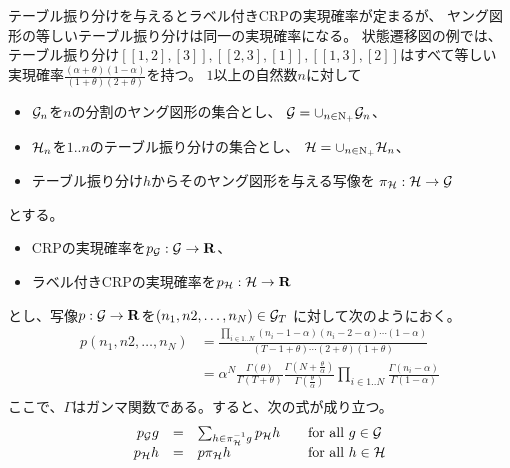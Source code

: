 	テーブル振り分けを与えるとラベル付きCRPの実現確率が定まるが、
	ヤング図形の等しいテーブル振り分けは同一の実現確率になる。
	状態遷移図\label{eq:ラベル付きCRPの遷移図その二}の例では、
	テーブル振り分け$[[1,2],[3]],[[2,3],[1]],[[1,3],[2]]$はすべて等しい
	実現確率$\frac{(\alpha+\theta)(1-\alpha)}{(1+\theta)(2+\theta)}$を持つ。
	$1$以上の自然数$n$に対して
	\begin{itemize}\setlength{\itemsep}{-1mm} %
		\item ${\mathcal{G}}_n$を$n$の分割のヤング図形の集合とし、
		${\mathcal{G}}=\cup_{n\in\operatorname{N}_+}{\mathcal{G}}_n$、
		\item ${\mathcal{H}}_n$を$1..n$のテーブル振り分けの集合とし、
		${\mathcal{H}}=\cup_{n\in\operatorname{N}_+}{\mathcal{H}}_n$、
		\item テーブル振り分け$h$からそのヤング図形を与える写像を
		$\pi_{{\mathcal{H}}}:{\mathcal{H}}\to{\mathcal{G}}$
	\end{itemize} %
	とする。
	\begin{itemize}\setlength{\itemsep}{-1mm} %
		\item CRPの実現確率を$p_{{\mathcal{G}}}:{\mathcal{G}}\to {\mathbf{R}}$、
		\item ラベル付きCRPの実現確率を$p_{{\mathcal{H}}}:{\mathcal{H}}\to {\mathbf{R}}$
	\end{itemize} %
	とし、写像$p:{\mathcal{G}}\to{\mathbf{R}}$を$(n_1,n2,\dots,n_N)\in{\mathcal{G}}_T$
	に対して次のようにおく。
	\begin{equation*}\begin{split} %
		p(n_1,n2,\dots,n_N)
			&= \frac{\prod_{i\in1..N}(n_i-1-\alpha)(n_i-2-\alpha)\cdots(1-\alpha)}
				{(T-1+\theta)\cdots(2+\theta)(1+\theta)} \\
			&= \alpha^N\frac{\Gamma(\theta)}{\Gamma(T+\theta)}
				\frac{\Gamma(N+\frac{\theta}{\alpha})}{\Gamma(\frac{\theta}{\alpha})}
				\prod_{i\in1..N}\frac{\Gamma(n_i-\alpha)}{\Gamma(1-\alpha)} \\
	\end{split}\end{equation*} %
	ここで、$\Gamma$はガンマ関数である。すると、次の式が成り立つ。
	\begin{equation*}\begin{array}{rcll} %
		p_{\mycal{G}}g &=& \sum_{h\in\pi_{\mycal{H}}^{-1}g}p_{\mycal{H}}h
			& \quad\text{for all }g\in\mycal{G} \\
		p_{\mycal{H}}h &=& p\pi_{\mycal{H}}h
			& \quad\text{for all }h\in\mycal{H} \\
	\end{array}\end{equation*} %
